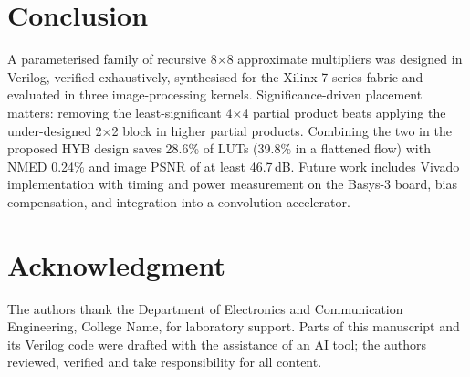 \documentclass[conference]{IEEEtran}
\begin{document}
\section{Conclusion}
A parameterised family of recursive 8$\times$8 approximate multipliers was designed in Verilog, verified exhaustively, synthesised for the Xilinx 7-series fabric and evaluated in three image-processing kernels. Significance-driven placement matters: removing the least-significant 4$\times$4 partial product beats applying the under-designed 2$\times$2 block in higher partial products. Combining the two in the proposed HYB design saves 28.6\% of LUTs (39.8\% in a flattened flow) with NMED 0.24\% and image PSNR of at least 46.7\,dB. Future work includes Vivado implementation with timing and power measurement on the Basys-3 board, bias compensation, and integration into a convolution accelerator.

\section*{Acknowledgment}
The authors thank the Department of Electronics and Communication Engineering, College Name, for laboratory support. Parts of this manuscript and its Verilog code were drafted with the assistance of an AI tool; the authors reviewed, verified and take responsibility for all content.



\end{document}
